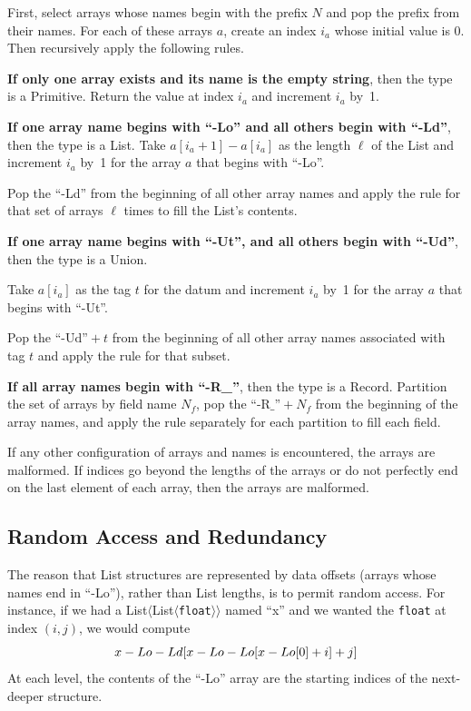 \documentclass[10pt, conference, compsocconf]{IEEEtran}
\begin{document}
First, select arrays whose names begin with the prefix $N$ and pop the prefix from their names. For each of these arrays $a$, create an index $i_a$ whose initial value is 0. Then recursively apply the following rules.

{\bf If only one array exists and its name is the empty string}, then the type is a Primitive. Return the value at index $i_a$ and increment $i_a$ by~1.

{\bf If one array name begins with ``-Lo'' and all others begin with ``-Ld''}, then the type is a List. Take $a[i_a + 1] - a[i_a]$ as the length $\ell$ of the List and increment $i_a$ by~1 for the array $a$ that begins with ``-Lo''.

Pop the ``-Ld'' from the beginning of all other array names and apply the rule for that set of arrays $\ell$ times to fill the List's contents.

{\bf If one array name begins with ``-Ut'', and all others begin with ``-Ud''}, then the type is a Union.

Take $a[i_a]$ as the tag $t$ for the datum and increment $i_a$ by~1 for the array $a$ that begins with ``-Ut''.

Pop the $\mbox{``-Ud''} + t$ from the beginning of all other array names associated with tag $t$ and apply the rule for that subset.

{\bf If all array names begin with ``-R\_''}, then the type is a Record. Partition the set of arrays by field name $N_f$, pop the $\mbox{``-R\_''} + N_f$ from the beginning of the array names, and apply the rule separately for each partition to fill each field.

If any other configuration of arrays and names is encountered, the arrays are malformed. If indices go beyond the lengths of the arrays or do not perfectly end on the last element of each array, then the arrays are malformed.

\subsection{Random Access and Redundancy}
\label{random-access-and-redundancy}

The reason that List structures are represented by data offsets (arrays whose names end in ``-Lo''), rather than List lengths, is to permit random access. For instance, if we had a List$\langle$List$\langle${\tt float}$\rangle\rangle$ named ``x'' and we wanted the {\tt float} at index $(i, j)$, we would compute
\[ \mbox{x-Lo-Ld{\tt [}x-Lo-Lo{\tt [}x-Lo{\tt [}} 0 \mbox{\tt ]} + i \mbox{\tt ]} + j \mbox{\tt ]} \]
At each level, the contents of the ``-Lo'' array are the starting indices of the next-deeper structure.
\end{document}
